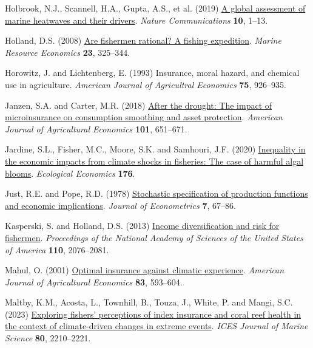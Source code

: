 \documentclass[
  letterpaper,
  DIV=11,
  numbers=noendperiod]{scrartcl}
\newlength{\cslhangindent}
\newlength{\cslentryspacingunit} %
\newenvironment{CSLReferences}[2] %
 {%
  \setlength{\parindent}{0pt}
  \ifodd #1
  \let\oldpar\par
  \def\par{\hangindent=\cslhangindent\oldpar}
  \fi
  \setlength{\parskip}{#2\cslentryspacingunit}
 }%
 {}
\theoremstyle{plain}
\theoremstyle{plain}
\theoremstyle{remark}
\begin{document}
\begin{CSLReferences}{1}{0}
\leavevmode{}%
Holbrook, N.J., Scannell, H.A., Gupta, A.S., et al. (2019)
\href{https://doi.org/10.1038/s41467-019-10206-z}{A global assessment of
marine heatwaves and their drivers}. \emph{Nature Communications}
\textbf{10}, 1--13.

\leavevmode{}%
Holland, D.S. (2008)
\href{https://doi.org/10.1086/mre.23.3.42629621}{Are fishermen rational?
A fishing expedition}. \emph{Marine Resource Economics} \textbf{23},
325--344.

\leavevmode{}%
Horowitz, J. and Lichtenberg, E. (1993) Insurance, moral hazard, and
chemical use in agriculture. \emph{American Journal of Agricultral
Economics} \textbf{75}, 926--935.

\leavevmode{}%
Janzen, S.A. and Carter, M.R. (2018)
\href{https://doi.org/10.1093/ajae/aay061}{After the drought: The impact
of microinsurance on consumption smoothing and asset protection}.
\emph{American Journal of Agricultural Economics} \textbf{101},
651--671.

\leavevmode{}%
Jardine, S.L., Fisher, M.C., Moore, S.K. and Samhouri, J.F. (2020)
\href{https://doi.org/10.1016/j.ecolecon.2020.106691}{Inequality in the
economic impacts from climate shocks in fisheries: The case of harmful
algal blooms}. \emph{Ecological Economics} \textbf{176}.

\leavevmode{}%
Just, R.E. and Pope, R.D. (1978)
\href{https://doi.org/10.1016/0304-4076(78)90006-4}{Stochastic
specification of production functions and economic implications}.
\emph{Journal of Econometrics} \textbf{7}, 67--86.

\leavevmode{}%
Kasperski, S. and Holland, D.S. (2013)
\href{https://doi.org/10.1073/pnas.1212278110}{Income diversification
and risk for fishermen}. \emph{Proceedings of the National Academy of
Sciences of the United States of America} \textbf{110}, 2076--2081.

\leavevmode{}%
Mahul, O. (2001) \href{https://doi.org/10.1111/0002-9092.00180}{Optimal
insurance against climatic experience}. \emph{American Journal of
Agricultural Economics} \textbf{83}, 593--604.

\leavevmode{}%
Maltby, K.M., Acosta, L., Townhill, B., Touza, J., White, P. and Mangi,
S.C. (2023) \href{https://doi.org/10.1093/icesjms/fsac003}{Exploring
fishers' perceptions of index insurance and coral reef health in the
context of climate-driven changes in extreme events}. \emph{ICES Journal
of Marine Science} \textbf{80}, 2210--2221.


\end{CSLReferences}
\end{document}
